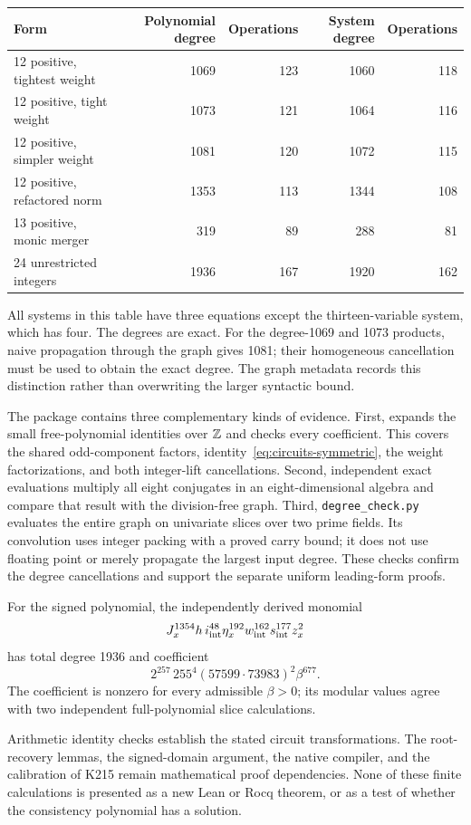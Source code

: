 \begin{center}
\small
\begin{tabular}{lrrrr}
\hline
Form & Polynomial degree & Operations & System degree & Operations\\
\hline
12 positive, tightest weight &1069&123&1060&118\\
12 positive, tight weight    &1073&121&1064&116\\
12 positive, simpler weight &1081&120&1072&115\\
12 positive, refactored norm&1353&113&1344&108\\
13 positive, monic merger   &319&89&288&81\\
24 unrestricted integers    &1936&167&1920&162\\
\hline
\end{tabular}
\end{center}
All systems in this table have three equations except the thirteen-variable
system, which has four. The degrees are exact. For the degree-1069 and
1073 products, naive propagation through the graph gives 1081; their
homogeneous cancellation must be used to obtain the exact degree.
The graph metadata records this distinction rather than overwriting the
larger syntactic bound.

The package contains three complementary kinds of evidence. First,
 expands the small free-polynomial
identities over $\mathbb Z$ and checks every coefficient. This covers the shared
odd-component factors, identity~\eqref{eq:circuits-symmetric}, the weight
factorizations, and both integer-lift cancellations. Second, independent
exact evaluations multiply all eight conjugates in an eight-dimensional
algebra and compare that result with the division-free graph. Third,
\texttt{degree\_check.py} evaluates the entire graph on univariate slices
over two prime fields. Its convolution uses integer packing with a proved
carry bound; it does not use floating point or merely propagate the
largest input degree. These checks confirm the degree cancellations and
support the separate uniform leading-form proofs.

For the signed polynomial, the independently derived monomial
\[
 J_x^{1354}h\,i_{\rm int}^{48}\eta_x^{192}
 w_{\rm int}^{162}s_{\rm int}^{177}z_x^2
\]
has total degree 1936 and coefficient
\[
 2^{257}\,255^4(57599\cdot73983)^2\beta^{677}.
\]
The coefficient is nonzero for every admissible $\beta>0$; its modular
values agree with two independent full-polynomial slice calculations.

Arithmetic identity checks establish the stated circuit transformations.
The root-recovery lemmas, the signed-domain argument, the native compiler,
and the calibration of K215 remain mathematical proof dependencies. None
of these finite calculations is presented as a new Lean or Rocq theorem,
or as a test of whether the consistency polynomial has a solution.
